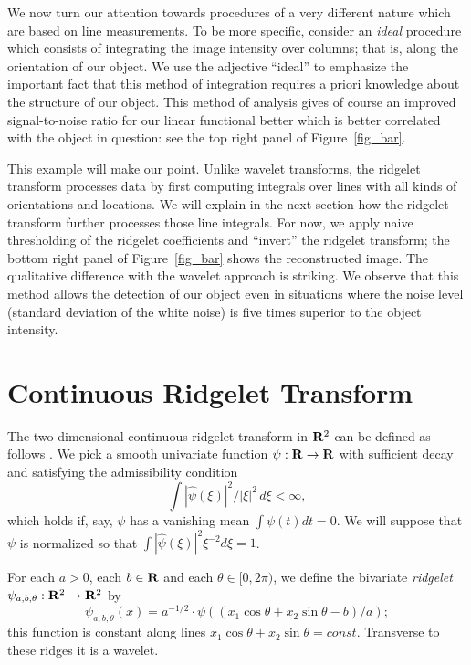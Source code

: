 We now turn our attention towards procedures of a very different
nature which are based on line measurements. To be more specific,
consider an {\em ideal} procedure which consists of integrating the
image intensity over columns; that is, along the orientation of our
object.  We use the adjective ``ideal'' to emphasize the important
fact that this method of integration requires a priori knowledge about
the structure of our object. This method of analysis gives of course
an improved signal-to-noise ratio for our linear functional better
which is better correlated with the object in question: 
see the top right panel of
Figure~\ref{fig_bar}.

This example will make our point. Unlike wa\-velet trans\-forms, the
rid\-gelet trans\-form pro\-cesses data by first computing integrals over
lines with all kinds of orientations and locations. We will explain in
the next section how the ridgelet transform further processes those
line integrals. For now, we apply naive thresholding of the ridgelet
coefficients and ``invert'' the ridgelet transform; the bottom right
panel of Figure~\ref{fig_bar} shows the reconstructed image. The
qualitative difference with the wavelet approach is striking. We
observe that this method allows the detection of our object even in
situations where the noise level (standard deviation of the white
noise) is five times superior to the object intensity. 

\section{Continuous Ridgelet Transform}

The two-dimensional continuous ridgelet transform in ${\bf R}^2$ can be
defined as follows \cite{Harmnet}. We pick a smooth univariate
function $\psi:{\bf R} \rightarrow {\bf R}$ with sufficient decay and satisfying the
admissibility condition
\begin{equation}
\label{eq:admissibility}
\int |\hat{\psi}(\xi)|^2/|\xi|^2 \, d\xi < \infty,
\end{equation}
which holds if, say, $\psi$ has a vanishing mean $\int
\psi(t) dt = 0$.  We will suppose that $\psi$ is normalized so that
$\int |\hat{\psi}(\xi)|^2 \xi^{-2} d\xi = 1$.

For each $a > 0$, each $b \in {\bf R}$ and each $\theta \in [0,2\pi)$, we
define the bivariate {\em ridgelet} $\psi_{a,b,\theta}: {\bf R}^2 \rightarrow
{\bf R}^2$
by
\begin{equation}
\label{eq:ridgelet}
       \psi_{a,b,\theta} (x) = a^{-1/2} \cdot
     \psi( (x_1 \cos\theta + x_2 \sin\theta  - b)/a);
\end{equation}
this function is constant along lines $x_1 \cos\theta + x_2 \sin\theta
= const$. Transverse to these ridges it is a wavelet.  

